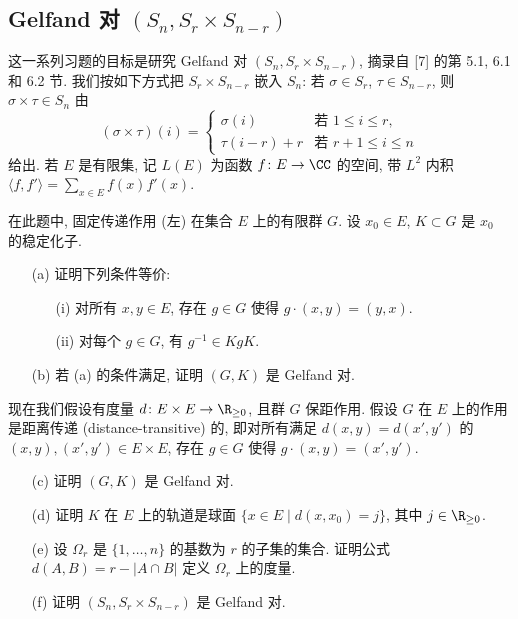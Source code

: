 \subsection{\texorpdfstring{Gelfand 对 $(S_n, S_r \times S_{n-r})$}{Gelfand 对 (S_n, S_r x S_{n-r})}}

这一系列习题的目标是研究 Gelfand 对 $(S_n, S_r \times S_{n-r})$, 摘录自 {[}7{]} 的第 5.1, 6.1 和 6.2 节. 我们按如下方式把 $S_r \times S_{n-r}$ 嵌入 $S_n$: 若 $\sigma \in S_r$, $\tau \in S_{n-r}$, 则 $\sigma \times \tau \in S_n$ 由
\[
(\sigma \times \tau)(i) = \begin{cases} \sigma(i) & \text{若 } 1 \leq i \leq r, \\ \tau(i - r) + r & \text{若 } r + 1 \leq i \leq n \end{cases}
\]
给出.
若 $E$ 是有限集, 记 $L(E)$ 为函数 $f \colon E \to \CC$ 的空间, 带 $L^2$ 内积 $\langle f, f' \rangle = \sum_{x \in E}f(x)f'(x)$.

\begin{exercise}[距离传递作用]
\label{ex:V.8.2.1}
在此题中, 固定传递作用 (左) 在集合 $E$ 上的有限群 $G$. 设 $x_0 \in E$, $K \subset G$ 是 $x_0$ 的稳定化子.
\begin{enumerate}
\item[(a)] 证明下列条件等价:
  \begin{enumerate}
  \item[(i)] 对所有 $x, y \in E$, 存在 $g \in G$ 使得 $g \cdot (x, y) = (y, x)$.
  \item[(ii)] 对每个 $g \in G$, 有 $g^{-1} \in KgK$.
  \end{enumerate}
\item[(b)] 若 (a) 的条件满足, 证明 $(G, K)$ 是 Gelfand 对.
\end{enumerate}
现在我们假设有度量 $d \colon E \times E \to \R_{\geq 0}$, 且群 $G$ 保距作用. 假设 $G$ 在 $E$ 上的作用是距离传递 (distance-transitive) 的, 即对所有满足 $d(x, y) = d(x', y')$ 的 $(x, y), (x', y') \in E \times E$, 存在 $g \in G$ 使得 $g \cdot (x, y) = (x', y')$.
\begin{enumerate}
\item[(c)] 证明 $(G, K)$ 是 Gelfand 对.
\item[(d)] 证明 $K$ 在 $E$ 上的轨道是球面 $\{x \in E \mid d(x, x_0) = j\}$, 其中 $j \in \R_{\geq 0}$.
\item[(e)] 设 $\Omega_r$ 是 $\{1, \ldots, n\}$ 的基数为 $r$ 的子集的集合. 证明公式 $d(A, B) = r - |A \cap B|$ 定义 $\Omega_r$ 上的度量.
\item[(f)] 证明 $(S_n, S_r \times S_{n-r})$ 是 Gelfand 对.
\end{enumerate}
\end{exercise}

